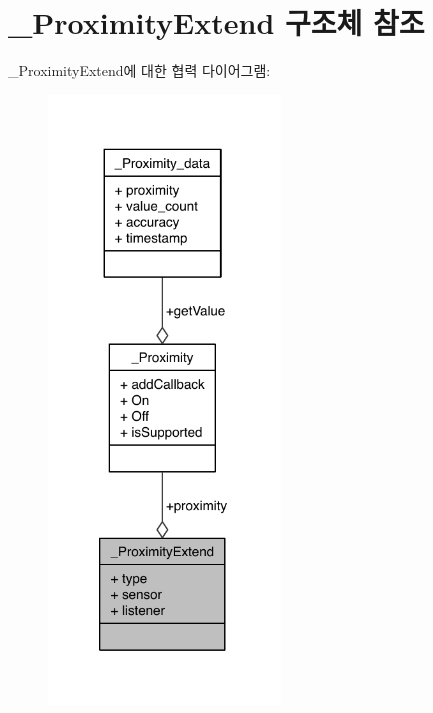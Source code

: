 \hypertarget{struct___proximity_extend}{\section{\-\_\-\-Proximity\-Extend 구조체 참조}
\label{struct___proximity_extend}
}


\-\_\-\-Proximity\-Extend에 대한 협력 다이어그램\-:\nopagebreak
\begin{figure}[H]
\begin{center}
\leavevmode
\includegraphics[width=175pt]{d5/d0c/struct___proximity_extend__coll__graph}
\end{center}
\end{figure}

